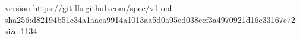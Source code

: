 version https://git-lfs.github.com/spec/v1
oid sha256:d82194b51c34a1aaca9914a1013aa5d0a95ed038ccf3a4970921d16e33167c72
size 1134
